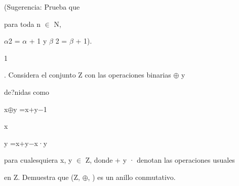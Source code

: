 \documentclass[a4paper,portrait,12pt]{article}
\begin{document}
\begin{flushleft}
(Sugerencia: Prueba que
\end{flushleft}





\begin{flushleft}
para toda n $\in$ N,
\end{flushleft}





\begin{flushleft}
$\alpha$2 = $\alpha$ + 1 y $\beta$ 2 = $\beta$ + 1).
\end{flushleft}





1





\begin{flushleft}
. Considera el conjunto Z con las operaciones binarias $\oplus$ y
\end{flushleft}





\begin{flushleft}
de?nidas como
\end{flushleft}





\begin{flushleft}
x$\oplus$y =x+y$-$1
\end{flushleft}


\begin{flushleft}
x
\end{flushleft}





\begin{flushleft}
y =x+y$-$x·y
\end{flushleft}





\begin{flushleft}
para cualesquiera x, y $\in$ Z, donde + y · denotan las operaciones usuales
\end{flushleft}


\begin{flushleft}
en Z. Demuestra que (Z, $\oplus$, ) es un anillo conmutativo.
\end{flushleft}
\end{document}
